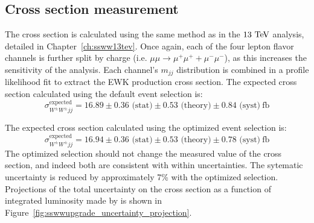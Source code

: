\subsection{Cross section measurement}\label{sswwupgrade:results_xsec}

The cross section is calculated using the same method as in the $13\tev$ analysis, detailed in Chapter~\ref{ch:ssww13tev}. 
Once again, each of the four lepton flavor channels is further split by charge (i.e. $\mu\mu\rightarrow\mu^+\mu^++\mu^-\mu^-$), as this increases the sensitivity of the analysis.
Each channel's $m_{jj}$ distribution is combined in a profile likelihood fit to extract the EWK \ssww production cross section.
The expected cross section calculated using the default event selection is:
\begin{equation}
  \sigma_{W^\pm W^\pm jj}^{\textrm{expected}} = 16.89 \pm 0.36 \textrm{\ (stat)} \pm 0.53 \textrm{\ (theory)} \pm 0.84 \textrm{\ (syst)}~\textrm{fb}
  \label{eq:sswwupgrade_xsec_default}
\end{equation}

The expected cross section calculated using the optimized event selection is:
\begin{equation}
    \sigma_{W^\pm W^\pm jj}^{\textrm{expected}} = 16.94 \pm 0.36 \textrm{\ (stat)} \pm 0.53 \textrm{\ (theory)} \pm 0.78 \textrm{\ (syst)}~\textrm{fb}
  \label{eq:sswwupgrade_xsec_optimized}
\end{equation}
The optimized selection should not change the measured value of the cross section, and indeed both are consistent with within uncertainties.
The sytematic uncertainty is reduced by approximately 7\% with the optimized selection.
Projections of the total uncertainty on the cross section as a function of integrated luminosity made by  is shown in Figure~\ref{fig:sswwupgrade_uncertainty_projection}.

